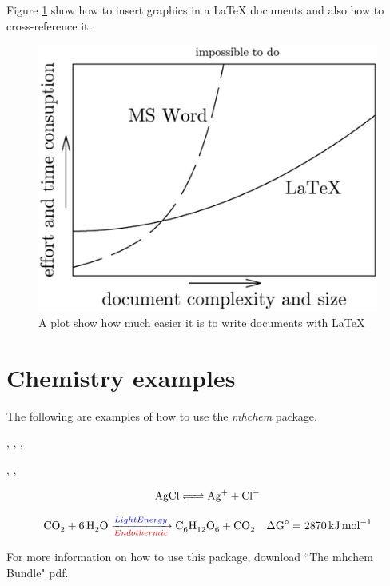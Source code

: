 Figure \ref{fig:WordVsLatex} show how to insert graphics in a \LaTeX{} documents and also how to cross-reference it.

\begin{figure}[h!]
\centering
\includegraphics[width=0.6 \textwidth]{pics/WordVsLatex.png}
\caption{A plot show how much easier it is to write documents with \LaTeX{}} \label{fig:WordVsLatex}
\end{figure}

\chapter{Chemistry examples}

The following are examples of how to use the \textit{mhchem} package.

, , , 





, , 

\begin{equation}
\ce{AgCl <=> Ag+ + Cl-}
\end{equation}

\begin{equation}
\ce{CO2 + 6H2O ->[\textcolor{blue}{Light Energy}][\textcolor{red}{Endothermic}] C6H12O6 + CO2 \quad \Delta G^{\circ}} = \SI{+2870}{kJ.mol^{-1}}
\end{equation}

For more information on how to use this package, download ``The mhchem Bundle" pdf. \cite{*}

\bibliomatter



